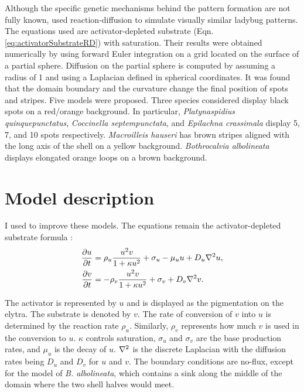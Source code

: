 Although the specific genetic mechanisms behind the pattern formation are not fully known, \citet{liaw2001} used reaction-diffusion to simulate visually similar ladybug patterns. The equations used are activator-depleted substrate (Eqn. \ref{eq:activatorSubstrateRD}) with saturation. Their results were obtained numerically by using forward Euler integration on a grid located on the surface of a partial sphere. Diffusion on the partial sphere is computed by assuming a radius of 1 and using a Laplacian defined in spherical coordinates. It was found that the domain boundary and the curvature change the final position of spots and stripes. Five models were proposed. Three species considered display black spots on a red/orange background. In particular, \textit{Platynaspidius quinquepunctatus}, \textit{Coccinella septempunctata}, and \textit{Epilachna crassimala} display 5, 7, and 10 spots respectively. \textit{Macroilleis hauseri} has brown stripes aligned with the long axis of the shell on a yellow background. \textit{Bothrocalvia albolineata} displays elongated orange loops on a brown background.

\section{Model description} 
I used \ProgramName{} to improve these models. The equations remain the activator-depleted substrate formula \citep{meinhardt1982}:
\begin{equation}
	\begin{aligned} \label{eq:ladybugRD}
   \frac{\partial u}{\partial t} &= \rho_u \frac{u^2v}{1+\kappa u^2} + \sigma_u - \mu_u u + D_u \nabla^2 u, \\
   \frac{\partial v}{\partial t} &= -\rho_v \frac{u^2v}{1+\kappa u^2} + \sigma_v + D_v \nabla^2 v.
	\end{aligned}
\end{equation}

The activator is represented by $u$ and is displayed as the pigmentation on the elytra. The substrate is denoted by $v$. The rate of conversion of $v$ into $u$ is determined by the reaction rate $\rho_u$. Similarly, $\rho_v$ represents how much $v$ is used in the conversion to $u$. $\kappa$ controls saturation, $\sigma_u$ and $\sigma_v$ are the base production rates, and $\mu_u$ is the decay of $u$. $\nabla^2$ is the discrete Laplacian with the diffusion rates being $D_u$ and $D_v$ for $u$ and $v$. The boundary conditions are no-flux, except for the model of  \textit{B. albolineata}, which contains a sink along the middle of the domain where the two shell halves would meet.

